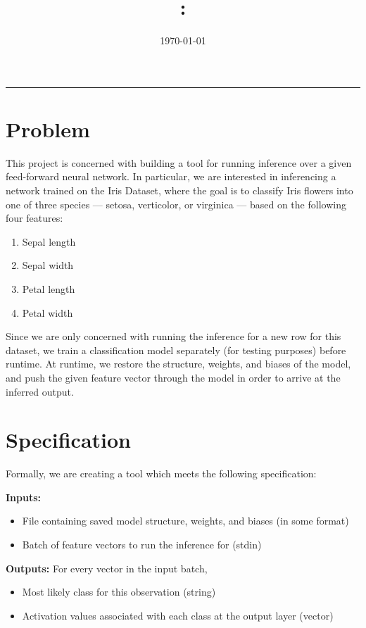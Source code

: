 \documentclass[12pt]{article}
\title{\code: \name}
\author{\me}
\date{\today}
\begin{document}
\maketitle
\hrule \bigskip

\section{Problem}
This project is concerned with building a tool for running inference over a given feed-forward neural network. In particular, we are interested in inferencing a network trained on the Iris Dataset, where the goal is to classify Iris flowers into one of three species --- setosa, verticolor, or virginica --- based on the following four features:
\begin{enumerate}
	\item Sepal length
	\item Sepal width
	\item Petal length
	\item Petal width
\end{enumerate}

Since we are only concerned with running the inference for a new row for this dataset, we train a classification model separately (for testing purposes) before runtime. At runtime, we restore the structure, weights, and biases of the model, and push the given feature vector through the model in order to arrive at the inferred output.

\section{Specification}
Formally, we are creating a tool which meets the following specification:\bigskip

\textbf{Inputs:} 
\begin{itemize}
	\item File containing saved model structure, weights, and biases (in some format)
	\item Batch of feature vectors to run the inference for (stdin)
\end{itemize}

\textbf{Outputs:}
For every vector in the input batch,
\begin{itemize}
	\item Most likely class for this observation (string)
	\item Activation values associated with each class at the output layer (vector)
\end{itemize}
\end{document}
